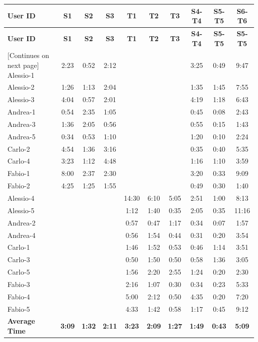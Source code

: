     \begin{tabularx}{\linewidth}{l|c|c|c|c|c|c|c|c|c}
    \toprule
    \textbf{User ID} & \textbf{S1} & \textbf{S2} & \textbf{S3} & \textbf{T1} & \textbf{T2} & \textbf{T3} & \textbf{S4-T4} & \textbf{S5-T5} & \textbf{S6-T6} \\
    \midrule
    \endfirsthead
    \toprule
    \textbf{User ID} & \textbf{S1} & \textbf{S2} & \textbf{S3} & \textbf{T1} & \textbf{T2} & \textbf{T3} & \textbf{S4-T4} & \textbf{S5-T5} & \textbf{S5-T5} \\
    \midrule
    \endhead
    \midrule
    \footnotesize [Continues on next page]
    \endfoot
    \bottomrule
    \endlastfoot
        Alessio-1 & 2:23 & 0:52 & 2:12 &  &  &  & 3:25 & 0:49 & 9:47 \\ \midrule
        Alessio-2 & 1:26 & 1:13 & 2:04 &  &  &  & 1:35 & 1:45 & 7:55 \\ \midrule
        Alessio-3 & 4:04 & 0:57 & 2:01 &  &  &  & 4:19 & 1:18 & 6:43 \\ \midrule
        Andrea-1 & 0:54 & 2:35 & 1:05 &  &  &  & 0:45 & 0:08 & 2:43 \\ \midrule
        Andrea-3 & 1:36 & 2:05 & 0:56 &  &  &  & 0:55 & 0:15 & 1:43 \\ \midrule
        Andrea-5 & 0:34 & 0:53 & 1:10 &  &  &  & 1:20 & 0:10 & 2:24 \\ \midrule
        Carlo-2 & 4:54 & 1:36 & 3:16 &  &  &  & 0:35 & 0:40 & 5:35 \\ \midrule
        Carlo-4 & 3:23 & 1:12 & 4:48 &  &  &  & 1:16 & 1:10 & 3:59 \\ \midrule
        Fabio-1 & 8:00 & 2:37 & 2:30 &  &  &  & 3:20 & 0:33 & 9:09 \\ \midrule
        Fabio-2 & 4:25 & 1:25 & 1:55 &  &  &  & 0:49 & 0:30 & 1:40 \\ \midrule
        Alessio-4 &  &  &  & 14:30 & 6:10 & 5:05 & 2:51 & 1:00 & 8:13 \\ \midrule
        Alessio-5 &  &  &  & 1:12 & 1:40 & 0:35 & 2:05 & 0:35 & 11:16 \\ \midrule
        Andrea-2 &  &  &  & 0:57 & 0:47 & 1:17 & 0:34 & 0:07 & 1:57 \\ \midrule
        Andrea-4 &  &  &  & 0:56 & 1:54 & 0:44 & 0:31 & 0:20 & 3:54 \\ \midrule
        Carlo-1 &  &  &  & 1:46 & 1:52 & 0:53 & 0:46 & 1:14 & 3:51 \\ \midrule
        Carlo-3 &  &  &  & 0:50 & 1:50 & 0:50 & 0:58 & 1:36 & 3:05 \\ \midrule
        Carlo-5 &  &  &  & 1:56 & 2:20 & 2:55 & 1:24 & 0:20 & 2:30 \\ \midrule
        Fabio-3 &  &  &  & 2:16 & 1:07 & 0:30 & 0:34 & 0:23 & 5:33 \\ \midrule
        Fabio-4 &  &  &  & 5:00 & 2:12 & 0:50 & 4:35 & 0:20 & 7:20 \\ \midrule
        Fabio-5 &  &  &  & 4:33 & 1:42 & 0:58 & 1:17 & 0:45 & 9:12 \\ \midrule
        \textbf{Average Time} & \textbf{3:09} & \textbf{1:32} & \textbf{2:11} & \textbf{3:23} & \textbf{2:09} & \textbf{1:27} & \textbf{1:49} & \textbf{0:43} & \textbf{5:09}
    \end{tabularx}

